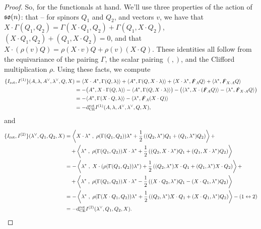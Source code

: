 \documentclass[10pt, oneside]{article}
\begin{document}
\begin{proof}
So, for the functionals at hand.  We'll use three properties of the action of $\mathfrak{so}(n)$: that -- for spinors $Q_1$ and  $Q_2$, and vectors $v$, we have that $X \cdot \Gamma(Q_1, Q_2) = \Gamma(X \cdot Q_1, Q_2) + \Gamma(Q_1, X \cdot Q_2)$,  $(X \cdot Q_1, Q_2) + (Q_1, X \cdot Q_2) = 0$, and that $X \cdot (\rho(v)Q) = \rho(X \cdot v)Q + \rho(v)(X \cdot Q)$.  These identities all follow from the equivariance of the pairing $\Gamma$, the scalar pairing $(,)$, and the Clifford multiplication $\rho$.  Using these facts, we compute
\begin{align*}
\{I_{\mathrm{rot}}, I^{(1)}\}(A,\lambda, A^\vee, \lambda^\vee, Q, X) &= \langle X \cdot A^* , \Gamma(Q, \lambda)\rangle + \langle A^* , \Gamma(Q, X \cdot \lambda)\rangle + \langle X \cdot \lambda^*, \slashed{F}_A Q\rangle +  \langle\lambda^*, \slashed{F}_{X \cdot A} Q\rangle \\
&= -\big(A^* , X \cdot \Gamma(Q, \lambda)\rangle - \langle A^* , \Gamma(Q, X \cdot \lambda)\rangle\big) - \big(\langle\lambda^*, X \cdot( \slashed{F}_A Q)\rangle -  \langle\lambda^*, \slashed{F}_{X \cdot A} Q\rangle\big)\\
&= - \langle A^* , \Gamma(X \cdot Q, \lambda)\rangle - \langle\lambda^*, \slashed{F}_A (X \cdot Q)\rangle\\
&= -{\rm d}^{\mathrm{rot}}_{\mathrm{CE}} I^{(1)}(A,\lambda, A^\vee, \lambda^\vee, Q, X),
\end{align*}
and
\begin{align*}
\{I_{\mathrm{rot}}, I^{(2)}\}(\lambda^\vee, Q_1, Q_2, X) &= \left\langle X \cdot \lambda^* \;,\; \rho(\Gamma(Q_1,Q_2)) \lambda^* + \frac 12 \left((Q_2, \lambda^*)Q_1 + (Q_1, \lambda^*)Q_2\right)\right\rangle + \\
&\quad + \left\langle\lambda^* \;,\; \rho(\Gamma(Q_1,Q_2)) X \cdot \lambda^* + \frac 12 \left((Q_2, X \cdot \lambda^*)Q_1 + (Q_1, X \cdot \lambda^*)Q_2\right)\right\rangle \\
&= - \left\langle\lambda^* \;,\; X \cdot(\rho(\Gamma(Q_1,Q_2)) \lambda^*) + \frac 12 \left((Q_2, \lambda^*)X \cdot Q_1 + (Q_1, \lambda^*)X \cdot Q_2\right)\right\rangle + \\
&\quad + \left\langle\lambda^* \;,\; \rho(\Gamma(Q_1,Q_2)) X \cdot \lambda^* - \frac 12 \left((X \cdot Q_2, \lambda^*)Q_1 - (X \cdot Q_1,  \lambda^*)Q_2\right)\right\rangle \\
&= - \left\langle\lambda^* \;,\; \rho(\Gamma(X \cdot Q_1,Q_2)) \lambda^* + \frac 12 \left((Q_2, \lambda^*)X \cdot Q_1 + (X \cdot Q_1, \lambda^*)Q_2\right)\right\rangle - (1 \leftrightarrow 2)\\
&= -{\rm d}^{\mathrm{rot}}_{\mathrm{CE}} I^{(2)}(\lambda^\vee, Q_1, Q_2, X).
\end{align*}
\end{proof}
\end{document}
